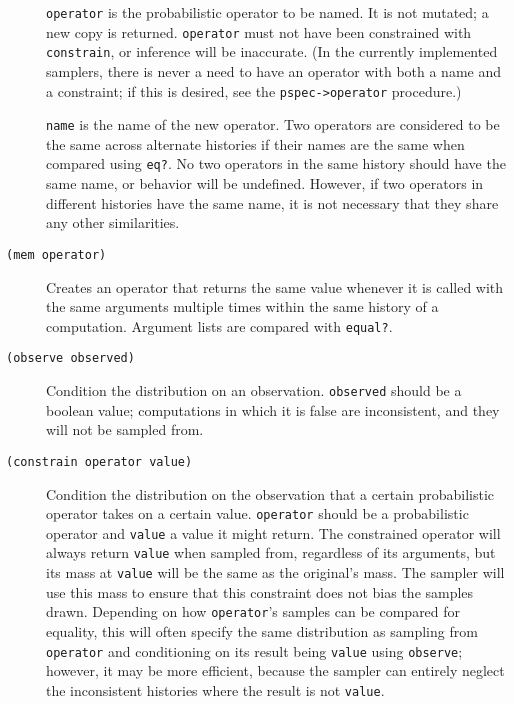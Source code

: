 \documentclass{article}
\begin{document}
\begin{description}
    \texttt{operator} is the probabilistic operator to be named. It is
    not mutated; a new copy is returned. \texttt{operator} must not
    have been constrained with \texttt{constrain}, or inference will
    be inaccurate. (In the currently implemented samplers, there is
    never a need to have an operator with both a name and a
    constraint; if this is desired, see the \texttt{pspec->operator}
    procedure.)

    \texttt{name} is the name of the new operator. Two operators are
    considered to be the same across alternate histories if their
    names are the same when compared using \texttt{eq?}. No two
    operators in the same history should have the same name, or
    behavior will be undefined. However, if two operators in different
    histories have the same name, it is not necessary that they share
    any other similarities.
    
  \item[\texttt{(mem operator)}] \hfill

    Creates an operator that returns the same value whenever it is
    called with the same arguments multiple times within the same
    history of a computation. Argument lists are compared with
    \texttt{equal?}.
    
  \item[\texttt{(observe observed)}] \hfill

    Condition the distribution on an observation. \texttt{observed}
    should be a boolean value; computations in which it is false are
    inconsistent, and they will not be sampled from.
    
  \item[\texttt{(constrain operator value)}] \hfill

    Condition the distribution on the observation that a certain
    probabilistic operator takes on a certain value. \texttt{operator}
    should be a probabilistic operator and \texttt{value} a value it
    might return. The constrained operator will always return
    \texttt{value} when sampled from, regardless of its arguments, but
    its mass at \texttt{value} will be the same as the original's
    mass. The sampler will use this mass to ensure that this
    constraint does not bias the samples drawn. Depending on how
    \texttt{operator}'s samples can be compared for equality, this
    will often specify the same distribution as sampling from
    \texttt{operator} and conditioning on its result being
    \texttt{value} using \texttt{observe}; however, it may be more
    efficient, because the sampler can entirely neglect the
    inconsistent histories where the result is not \texttt{value}.
    

\end{description}
\end{document}
